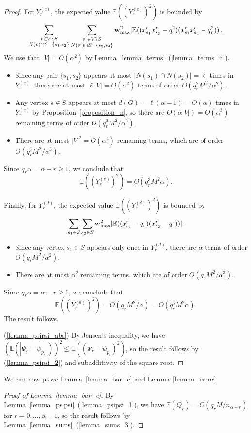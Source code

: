 \documentclass{article}
\theoremstyle{plain}
\theoremstyle{remark}
\theoremstyle{plain}
\numberwithin{equation}{section}
\renewcommand{\b}{{\bf{w}}}
\begin{document}
\begin{proof}
		For $Y_r^{(c)}$, the expected value $\mathbb{E}((Y_r^{(c)})^2)$ is bounded by $$\sum_{\substack{v\in V\setminus S\\N(v)\cap S=\{s_1,s_2\}}}\sum_{\substack{v'\in V\setminus S\\N(v')\cap S=\{s_3,s_4\}}}\b_{\max}^2|\mathbb{E}((x_{s_1}^rx_{s_2}^r-q_r^2)(x_{s_3}^rx_{s_4}^r-q_r^2))|.$$ We use that $|V|=O(\alpha^2)$ by Lemma~\ref{lemma_terms}~(\ref{lemma_terms_n}).
		\begin{itemize}
			\item Since any pair $\{s_1,s_2\}$ appears at most $|N(s_1)\cap N(s_2)|=\ell$ times in $Y_r^{(c)}$, there are at most $\ell|V|=O(\alpha^2)$ terms of order $O(q_r^2M^2/\alpha^2)$.
			\item Any vertex $s\in S$ appears at most $d(G)=\ell(\alpha-1)=O(\alpha)$ times in $Y_r^{(c)}$ by Proposition~\ref{proposition_n}, so there are $O(\alpha|V|)=O(\alpha^3)$ remaining terms of order $O(q_r^3M^2/\alpha^2)$.
			\item There are at most $|V|^2=O(\alpha^4)$ remaining terms, which are of order $O(q_r^3M^2/\alpha^3)$.
		\end{itemize}
		Since $q_r\alpha=\alpha-r\geq1$, we conclude that $$\mathbb{E}((Y_r^{(c)})^2)=O(q_r^3M^2\alpha).$$
		
		Finally, for $Y_r^{(d)}$, the expected value $\mathbb{E}((Y_r^{(d)})^2)$ is bounded by $$\sum_{s_1\in S}\sum_{s_2\in S}\b_{\max}^2|\mathbb{E}((x_{s_1}^r-q_r)(x_{s_2}^r-q_r))|.$$
		\begin{itemize}
			\item Since any vertex $s_1\in S$ appears only once in $Y_r^{(d)}$, there are $\alpha$ terms of order $O(q_rM^2/\alpha^2)$.
			\item There are at most $\alpha^2$ remaining terms, which are of order $O(q_rM^2/\alpha^3)$.
		\end{itemize}
		Since $q_r\alpha=\alpha-r\geq1$, we conclude that $$\mathbb{E}((Y_r^{(d)})^2)=O(q_rM^2/\alpha)=O(q_r^3M^2\alpha).$$ The result follows.
		
		(\ref{lemma_psipsi_abs}) By Jensen's inequality, we have $(\mathbb{E}(|\Psi_r-\psi_{p_r}|))^2\leq\mathbb{E}((\Psi_r-\psi_{p_r})^2)$, so the result follows by (\ref{lemma_psipsi_2}) and subadditivity of the square root.
	\end{proof}
	
	We can now prove Lemma~\ref{lemma_bar_e} and Lemma~\ref{lemma_error}.
	
	\begin{proof}[Proof of Lemma~\ref{lemma_bar_e}]
		By Lemma~\ref{lemma_psipsi}~(\ref{lemma_psipsi_1}), we have $\mathbb{E}(\overline{Q}_r)=O(q_rM/n_{\alpha-r})$ for $r=0,\ldots,\alpha-1$, so the result follows by Lemma~\ref{lemma_sums}~(\ref{lemma_sums_3}).
	\end{proof}
	
\end{document}
